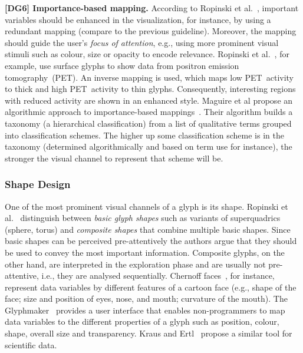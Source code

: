 \textbf{[DG6] Importance-based mapping.}
According to Ropinski et al.~\cite{Ropinski11glyphs},
important variables should be enhanced in the visualization, for instance, by using a redundant mapping (compare to the previous guideline).
Moreover, the mapping should guide the user's \emph{focus of attention}, e.g., using more prominent visual stimuli such as colour, size or opacity to encode relevance.
Ropinski et al.~\cite{ropinski07surfaceglyphs}, for example, use surface glyphs to show data from positron emission tomography~(PET).
An inverse mapping is used, which maps low PET~activity to thick and high PET~activity to thin glyphs.
Consequently, interesting regions with reduced activity are shown in an enhanced style.
Maguire et al propose an algorithmic approach to importance-based mappings~\cite{Maguire:2012:TVCG}. Their algorithm builds a taxonomy (a hierarchical classification) from a list of qualitative terms grouped into classification schemes. The higher up some classification scheme is in the taxonomy (determined algorithmically and based on term use for instance), the stronger the visual channel to represent that scheme will be.



\subsubsection{Shape Design}
One of the most prominent visual channels of a glyph is its shape.
Ropinski et al.~\cite{Ropinski11glyphs} distinguish between \emph{basic glyph shapes} such as variants of superquadrics~\cite{barr81} (sphere, torus) and \emph{composite shapes} that combine multiple basic shapes.  Since basic shapes can be perceived pre-attentively the authors argue that they should be used to convey the most important information.
Composite glyphs, on the other hand, are interpreted in the exploration phase and are usually not pre-attentive, i.e., they are analysed sequentially.
Chernoff faces~\cite{Chernoff73faces}, for instance, represent data variables by different features of a cartoon face (e.g., shape of the face; 
size and position of eyes, nose, and mouth; curvature of the mouth).
The Glyphmaker~\cite{Ribarsky94glyphMaker} provides a user interface that enables non-programmers to map data variables to the different properties of a glyph such as position, colour, shape, overall size and transparency.
Kraus and Ertl~\cite{KrausErtl01customizedGlyphs} propose a similar tool for scientific data.

